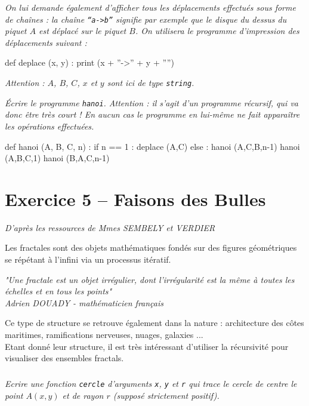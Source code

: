 \textit{On lui demande également d'afficher tous les déplacements effectués sous forme de chaînes : la chaîne 
\texttt{``a->b''} signifie par exemple que le disque du dessus du piquet $A$ est déplacé sur le piquet $B$. On 
utilisera le programme 
d'impression des déplacements suivant :\\}

\begin{py}
\begin{python}
def deplace (x, y) :
    print (x + ''->'' + y + ''\n'')
\end{python}
\end{py}

\textit{Attention : $A$, $B$, $C$, $x$ et $y$ sont ici de type \texttt{string}.\\}

\textit{Écrire le programme \texttt{hanoi}. Attention : il s'agit d'un programme récursif, qui va donc être très court 
! En 
aucun cas le programme en lui-même ne fait apparaître les opérations effectuées.}

\ifprof
\begin{corrige}

\begin{py}
\begin{python}
def hanoi (A, B, C, n) :
    if n == 1 :
	deplace (A,C)
    else :
	hanoi (A,C,B,n-1)
	hanoi (A,B,C,1)
	hanoi (B,A,C,n-1)
\end{python}
\end{py}

\end{corrige}
\else
\fi

\section*{Exercice 5 -- Faisons des Bulles}
\textit{ D'après les ressources de Mmes SEMBELY et VERDIER}
\setcounter{subparagraph}{0}

Les fractales sont des objets mathématiques fondés sur des figures géométriques se répétant à l'infini via un processus 
itératif.
\begin{center}
\textit{ "Une fractale est un objet irrégulier, dont l'irrégularité est la même à toutes les échelles et en tous les 
points"
\\
Adrien DOUADY - mathématicien français}
\end{center}
Ce type de structure se retrouve également dans la nature : architecture des côtes maritimes, ramifications nerveuses, 
nuages, galaxies ...
\\
Etant donné leur structure, il est très intéressant d'utiliser la récursivité pour visualiser des ensembles fractals.
\\
\subparagraph{}
\textit{Ecrire une fonction \texttt{cercle} d'arguments \texttt{x}, \texttt{y} et \texttt{r} qui trace le cercle de 
centre le point $A(x, y)$ et de rayon $r$ (supposé strictement positif).}

